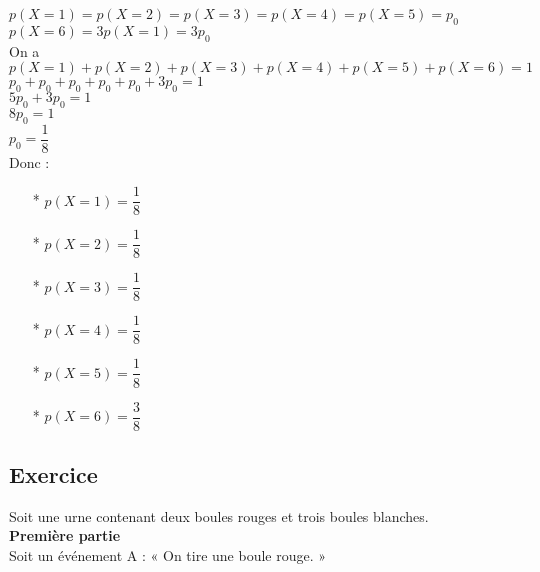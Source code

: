 $p\left(X=1\right) = p\left(X=2\right) = p\left(X=3\right) = p\left(X=4\right) = p\left(X=5\right) = p_0 $ \\

$p\left(X=6\right) = 3p\left(X=1\right) = 3p_0 $ \\

On a $p\left(X=1\right) + p\left(X=2\right) + p\left(X=3\right) + p\left(X=4\right) + p\left(X=5\right) + p\left(X=6\right) = 1$ \\

$ p_0 + p_0 + p_0 + p_0 + p_0 + 3p_0 = 1 $ \\

$ 5p_0 + 3p_0 = 1 $ \\

$ 8p_0 = 1 $ \\

 $p_0 = \dfrac{1}{8} $ \\
 
Donc :

\begin{itemize}
\item[*] $p\left(X=1\right) = \dfrac{1}{8} $ \\
\item[*] $p\left(X=2\right) = \dfrac{1}{8} $ \\
\item[*] $p\left(X=3\right) = \dfrac{1}{8} $ \\
\item[*] $p\left(X=4\right) = \dfrac{1}{8} $ \\
\item[*] $p\left(X=5\right) = \dfrac{1}{8} $ \\
\item[*] $p\left(X=6\right) = \dfrac{3}{8} $ \\
\end{itemize}

\newpage

\subsection{Exercice }

Soit une urne contenant deux boules rouges et trois boules blanches. \\

\textbf{Première partie} \\

Soit un événement A : « On tire une boule rouge. » \\

